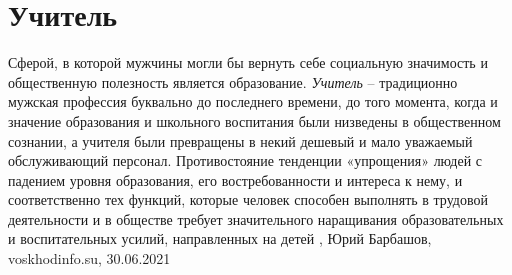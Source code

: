  
 
 
 
 
\chapter{Учитель}
\label{sec:slova.uchitel}

Сферой, в которой мужчины могли бы вернуть себе социальную значимость и
общественную полезность является образование. \emph{Учитель} – традиционно
мужская профессия буквально до последнего времени, до того момента, когда и
значение образования и школьного воспитания были низведены в общественном
сознании, а учителя были превращены в некий дешевый и мало уважаемый
обслуживающий персонал.  Противостояние тенденции «упрощения» людей с падением
уровня образования, его востребованности и интереса к нему, и соответственно
тех функций, которые человек способен выполнять в трудовой деятельности и в
обществе требует значительного наращивания образовательных и воспитательных
усилий, направленных на детей
, 
Юрий Барбашов, voskhodinfo.su, 30.06.2021

